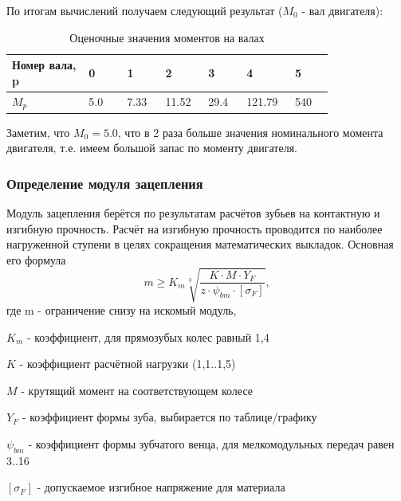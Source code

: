 \documentclass[14pt,a4paper,russian]{scrartcl}
\begin{document}
        По итогам вычислений получаем следующий результат (\( M_0 \) - вал двигателя):
        \begin{table}[h!]
            \begin{center}
                \begin{tabular}{p{0.2\linewidth}p{0.1\linewidth}p{0.1\linewidth}p{0.1\linewidth}p{0.1\linewidth}p{0.1\linewidth}p{0.1\linewidth}}
                    \hline
                    Номер вала, p & 0 & 1 & 2 & 3 & 4 & 5 \\
                    \hline
                    \( M_p \) & 5.0 & 7.33 & 11.52 & 29.4 & 121.79 & 540 \\
                    \hline
                \end{tabular}
                \caption{Оценочные значения моментов на валах}\label{tab:moments__shaft_estimate}
            \end{center}
        \end{table}

        Заметим, что \( M_0=5.0 \), что в 2 раза больше значения номинального момента двигателя,
        т.е. имеем большой запас по моменту двигателя.

    \subsubsection{Определение модуля зацепления}
        Модуль зацепления берётся по результатам расчётов зубьев на контактную и
        изгибную прочность. Расчёт на изгибную прочность проводится по наиболее нагруженной ступени в целях
        сокращения математических выкладок. Основная его формула
        \[ m \geq K_m\sqrt[3]{\frac{K\cdot M\cdot Y_F}{z\cdot\psi_{bm}\cdot[\sigma_F]}}, \]
        где m - ограничение снизу на искомый модуль,\par
            \( K_m \) - коэффициент, для прямозубых колес равный 1,4\par 
            \( K \) - коэффициент расчётной нагрузки (1,1..1,5)\par
            \( M \) - крутящий момент на соответствующем колесе\par
            \( Y_F \) - коэффициент формы зуба, выбирается по таблице/графику\par
            \( \psi_{bm} \) - коэффициент формы зубчатого венца, для мелкомодульных передач равен 3..16\par
            \( [\sigma_F] \) - допускаемое изгибное напряжение для материала\par
        
\end{document}
